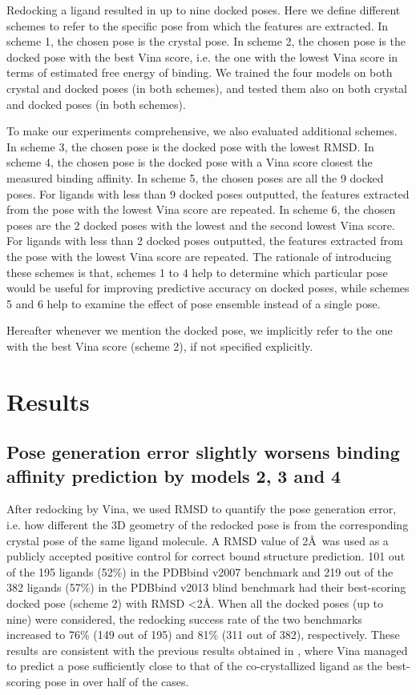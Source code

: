 \documentclass[twocolumn]{bmcart}
\begin{document}
Redocking a ligand resulted in up to nine docked poses. Here we define different schemes to refer to the specific pose from which the features are extracted. In scheme 1, the chosen pose is the crystal pose. In scheme 2, the chosen pose is the docked pose with the best Vina score, i.e. the one with the lowest Vina score in terms of estimated free energy of binding. We trained the four models on both crystal and docked poses (in both schemes), and tested them also on both crystal and docked poses (in both schemes).

To make our experiments comprehensive, we also evaluated additional schemes. In scheme 3, the chosen pose is the docked pose with the lowest RMSD. In scheme 4, the chosen pose is the docked pose with a Vina score closest the measured binding affinity. In scheme 5, the chosen poses are all the 9 docked poses. For ligands with less than 9 docked poses outputted, the features extracted from the pose with the lowest Vina score are repeated. In scheme 6, the chosen poses are the 2 docked poses with the lowest and the second lowest Vina score. For ligands with less than 2 docked poses outputted, the features extracted from the pose with the lowest Vina score are repeated. The rationale of introducing these schemes is that, schemes 1 to 4 help to determine which particular pose would be useful for improving predictive accuracy on docked poses, while schemes 5 and 6 help to examine the effect of pose ensemble instead of a single pose.

Hereafter whenever we mention the docked pose, we implicitly refer to the one with the best Vina score (scheme 2), if not specified explicitly.

\section*{Results}

\subsection*{Pose generation error slightly worsens binding affinity prediction by models 2, 3 and 4}

After redocking by Vina, we used RMSD to quantify the pose generation error, i.e. how different the 3D geometry of the redocked pose is from the corresponding crystal pose of the same ligand molecule. A RMSD value of 2\AA\ was used as a publicly accepted positive control for correct bound structure prediction. 101 out of the 195 ligands (52\%) in the PDBbind v2007 benchmark and 219 out of the 382 ligands (57\%) in the PDBbind v2013 blind benchmark had their best-scoring docked pose (scheme 2) with RMSD \textless 2\AA. When all the docked poses (up to nine) were considered, the redocking success rate of the two benchmarks increased to 76\% (149 out of 195) and 81\% (311 out of 382), respectively. These results are consistent with the previous results obtained in \cite{1362}, where Vina managed to predict a pose sufficiently close to that of the co-crystallized ligand as the best-scoring pose in over half of the cases.
\end{document}
